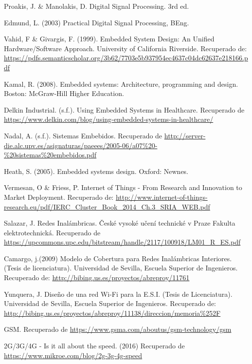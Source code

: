 \begin{thebibliography}{0}
	 Proakis, J. \& Manolakis, D. Digital Signal Processing. 3rd ed.
	
	 Edmund, L. (2003) Practical Digital Signal Processing, BEng.
	
		Vahid, F \& Givargis, F. (1999). Embedded System Design: An Unified Hardware/Software Approach. University of California Riverside. Recuperado de: \url{https://pdfs.semanticscholar.org/3b62/7703e5b937954ec4637c04dc62637e218166.pdf}
	
	 Kamal, R. (2008). Embedded systems: Architecture, programming and design. Boston: McGraw-Hill Higher Education.
	
	 Delkin Industrial. (s.f.). Using Embedded Systems in Healthcare. Recuperado de  \url{https://www.delkin.com/blog/using-embedded-systems-in-healthcare/}
	
	 Nadal, A. (s.f.). Sistemas Embebidos. Recuperado de  \url{http://server-die.alc.upv.es/asignaturas/paeees/2005-06/a07%20-%20sistemas%20embebidos.pdf}
	
	 Heath, S. (2005). Embedded systems design. Oxford: Newnes.
	
	 Vermesan, O \& Friess, P. Internet of Things - From Research and Innovation to Market Deployment. Recuperado de:  \url{http://www.internet-of-things-research.eu/pdf/IERC_Cluster_Book_2014_Ch.3_SRIA_WEB.pdf}
	
	 Salazar, J. Redes Inalámbricas. České vysoké učení technické v Praze Fakulta elektrotechnická. Recuperado de \url{https://upcommons.upc.edu/bitstream/handle/2117/100918/LM01_R_ES.pdf}
	
	 Camargo, j.(2009) Modelo de Cobertura para Redes Inalámbricas Interiores. (Tesis de licenciatura). Universidad de Sevilla, Escuela Superior de Ingenieros. Recuperado de: \url{http://bibing.us.es/proyectos/abreproy/11761}
	
	 Yunquera, J. Diseño de una red Wi-Fi para la E.S.I. (Tesis de Licenciatura). Universidad de Sevilla, Escuela Superior de Ingenieros. Recuperado de: \url{http://bibing.us.es/proyectos/abreproy/11138/direccion/memoria%252F}
	
	 GSM. Recuperado de \url{https://www.gsma.com/aboutus/gsm-technology/gsm}
	
	 2G/3G/4G - Is it all about the speed. (2016) Recuperado de \url{https://www.mikroe.com/blog/2g-3g-4g-speed}
	

\end{thebibliography}
